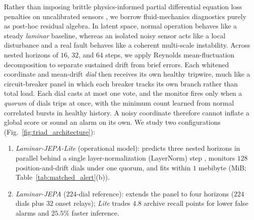 Rather than imposing brittle physics-informed partial differential equation loss penalties on uncalibrated sensors \cite{wang2022pinns, rathore2024challenges}, we borrow fluid-mechanics diagnostics purely as post-hoc residual algebra. In latent space, normal operation behaves like a steady \emph{laminar} baseline, whereas an isolated noisy sensor acts like a local disturbance and a real fault behaves like a coherent multi-scale instability. Across nested horizons of $16$, $32$, and $64$ steps, we apply Reynolds mean-fluctuation decomposition \cite{reynolds1895dynamical} to separate sustained drift from brief errors. Each whitened coordinate and mean-drift \emph{dial} then receives its own healthy tripwire, much like a circuit-breaker panel in which each breaker tracks its own branch rather than total load. Each dial casts at most one vote, and the monitor fires only when a \emph{quorum} of dials trips at once, with the minimum count learned from normal correlated bursts in healthy history. A noisy coordinate therefore cannot inflate a global score or sound an alarm on its own. We study two configurations (Fig.~\ref{fig:triad_architecture}):
\begin{enumerate}[leftmargin=*, nosep, itemsep=1pt]
    \item \emph{Laminar-JEPA-Lite} (operational model): predicts three nested horizons in parallel behind a single layer-normalization (LayerNorm) step \cite{ba2016layernormalization}, monitors $128$ position-and-drift dials under one quorum, and fits within $1$ mebibyte (MiB; Table~\ref{tab:matched_alert}(b)).
    \item \emph{Laminar-JEPA} ($224$-dial reference): extends the panel to four horizons ($224$ dials plus $32$ onset relays); \emph{Lite} trades $4.8$ archive recall points for lower false alarms and $25.5\%$ faster inference.
\end{enumerate}

